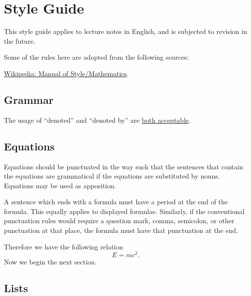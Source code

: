 \documentclass[hidelinks]{article}
\begin{document}
\section{Style Guide} %
\label{sec:style_guide}

This style guide applies to lecture notes in English, and is subjected to revision in the future.
\par
Some of the rules here are adopted from the following sources:
\begin{citemize}
    \item \href{https://en.wikipedia.org/wiki/Wikipedia:Manual_of_Style/Mathematics}{Wikipedia: Manual of Style/Mathematics}.
\end{citemize}

\subsection{Grammar} %
\label{sub:grammar}

The usage of ``denoted'' and ``denoted by'' are \href{https://english.stackexchange.com/questions/25179/denoted-by-or-just-denoted}{both acceptable}.


\subsection{Equations} %
\label{sub:equations}

Equations should be punctuated in the way such that the sentences that contain the equations are grammatical if the equations are substituted by nouns. Equations may be used as apposition.
\par
A sentence which ends with a formula must have a period at the end of the formula. This equally applies to displayed formulae. Similarly, if the conventional punctuation rules would require a question mark, comma, semicolon, or other punctuation at that place, the formula must have that punctuation at the end.
\begin{sample}
    Therefore we have the following relation
    \[ E = mc^2. \]
    Now we begin the next section.
\end{sample}


\subsection{Lists} %
\label{sub:lists}
\end{document}
